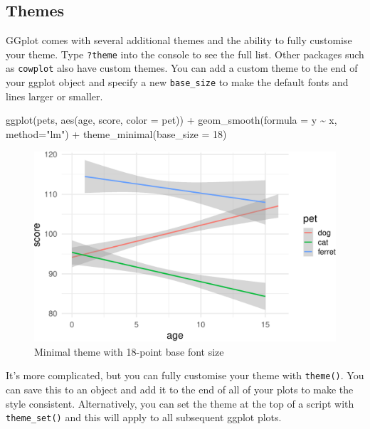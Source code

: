 \documentclass[
  oneside]{book}
\newenvironment{Shaded}{\begin{snugshade}}{\end{snugshade}}
\newcommand{\AttributeTok}[1]{\textcolor[rgb]{0.77,0.63,0.00}{#1}}
\newcommand{\DecValTok}[1]{\textcolor[rgb]{0.00,0.00,0.81}{#1}}
\newcommand{\FunctionTok}[1]{\textcolor[rgb]{0.00,0.00,0.00}{#1}}
\newcommand{\NormalTok}[1]{#1}
\newcommand{\SpecialCharTok}[1]{\textcolor[rgb]{0.00,0.00,0.00}{#1}}
\newcommand{\StringTok}[1]{\textcolor[rgb]{0.31,0.60,0.02}{#1}}
\begin{document}
\hypertarget{themes}{%
\subsection{Themes}\label{themes}}

GGplot comes with several additional themes and the ability to fully customise your theme. Type \texttt{?theme} into the console to see the full list. Other packages such as \texttt{cowplot} also have custom themes. You can add a custom theme to the end of your ggplot object and specify a new \texttt{base\_size} to make the default fonts and lines larger or smaller.

\begin{Shaded}
\begin{Highlighting}[]
\FunctionTok{ggplot}\NormalTok{(pets, }\FunctionTok{aes}\NormalTok{(age, score, }\AttributeTok{color =}\NormalTok{ pet)) }\SpecialCharTok{+}
  \FunctionTok{geom\_smooth}\NormalTok{(}\AttributeTok{formula =}\NormalTok{ y }\SpecialCharTok{\textasciitilde{}}\NormalTok{ x, }\AttributeTok{method=}\StringTok{"lm"}\NormalTok{) }\SpecialCharTok{+}
  \FunctionTok{theme\_minimal}\NormalTok{(}\AttributeTok{base\_size =} \DecValTok{18}\NormalTok{)}
\end{Highlighting}
\end{Shaded}

\begin{figure}

{\centering \includegraphics[width=0.9\linewidth]{images/themes-1} 

}

\caption{Minimal theme with 18-point base font size}\label{fig:themes}
\end{figure}

It's more complicated, but you can fully customise your theme with \texttt{theme()}. You can save this to an object and add it to the end of all of your plots to make the style consistent. Alternatively, you can set the theme at the top of a script with \texttt{theme\_set()} and this will apply to all subsequent ggplot plots.
\end{document}
